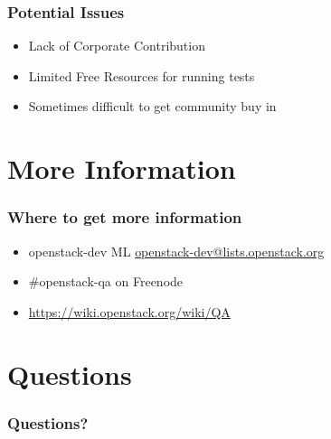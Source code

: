 \documentclass[aspectratio=169,11pt,hyperref={colorlinks=true}]{beamer}
\begin{document}
\begin{frame}
    \frametitle{Potential Issues}
    \begin{itemize}
        \item Lack of Corporate Contribution 
        \item Limited Free Resources for running tests
        \item Sometimes difficult to get community buy in
    \end{itemize}
\end{frame}

\section{More Information}
\begin{frame}
\frametitle{Where to get more information}
    \begin{itemize}
        \item openstack-dev ML\: \href{mailto:openstack-dev@lists.openstack.org}{openstack-dev@lists.openstack.org}
        \item \#openstack-qa on Freenode
        \item \href{https://wiki.openstack.org/wiki/QA}{https://wiki.openstack.org/wiki/QA}
    \end{itemize}
\end{frame}

\section{Questions}
\begin{frame}
\frametitle{Questions?}
\end{frame}
\end{document}
